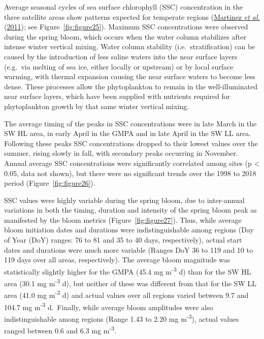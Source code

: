 \documentclass[12pt]{article}\usepackage[]{graphicx}\usepackage[]{color}
\begin{document}
Average seasonal cycles of sea surface chlorophyll (SSC) concentration in the three satellite areas show patterns expected for temperate regions (\protect\hyperlink{ref-martinez_2011}{Martinez \textit{et al.}} (\protect\hyperlink{ref-martinez_2011}{2011}); see Figure~\ref{fig:figure25}). Maximum SSC concentrations were observed during the spring bloom, which occurs when the water column stabilizes after intense winter vertical mixing. Water column stability (i.e.~stratification) can be caused by the introduction of less saline waters into the near surface layers (e.g.~via melting of sea ice, either locally or upstream) or by local surface warming, with thermal expansion causing the near surface waters to become less dense. These processes allow the phytoplankton to remain in the well-illuminated near surface layers, which have been supplied with nutrients required for phytoplankton growth by that same winter vertical mixing.

The average timing of the peaks in SSC concentrations were in late March in the SW HL area, in early April in the GMPA and in late April in the SW LL area. Following these peaks SSC concentrations dropped to their lowest values over the summer, rising slowly in fall, with secondary peaks occurring in November. Annual average SSC concentrations were significantly correlated among sites (p \textless{} 0.05, data not shown), but there were no significant trends over the 1998 to 2018 period (Figure~\ref{fig:figure26}).

SSC values were highly variable during the spring bloom, due to inter-annual variations in both the timing, duration and intensity of the spring bloom peak as manifested by the bloom metrics (Figure~\ref{fig:figure27}). Thus, while average bloom initiation dates and durations were indistinguishable among regions (Day of Year (DoY) ranges: 76 to 81 and 35 to 40 days, respectively), actual start dates and durations were much more variable (Ranges DoY 36 to 119 and 10 to 119 days over all areas, respectively). The average bloom magnitude was statistically slightly higher for the GMPA (45.4 mg m\textsuperscript{-3} d) than for the SW HL area (30.1 mg m\textsuperscript{-3} d), but neither of these was different from that for the SW LL area (41.0 mg m\textsuperscript{-3} d) and actual values over all regions varied between 9.7 and 104.7 mg m\textsuperscript{-3} d.~Finally, while average bloom amplitudes were also indistinguishable among regions (Range 1.43 to 2.20 mg m\textsuperscript{-3}), actual values ranged between 0.6 and 6.3 mg m\textsuperscript{-3}.
\end{document}
